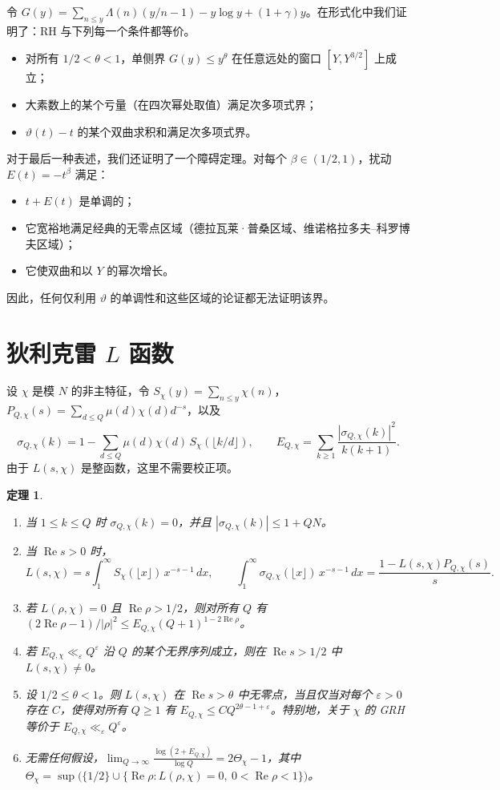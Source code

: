 \documentclass[11pt,a4paper]{amsart}
\newtheorem{teorema}{定理}
\theoremstyle{definition}
\theoremstyle{remark}
\renewcommand{\Re}{\operatorname{Re}}
\begin{document}
令 $G(y)=\sum_{n\le y}\Lambda(n)(y/n-1)-y\log y+(1+\gamma)y$。在形式化中我们证明了：RH 与下列每一个条件都等价。
\begin{itemize}
\item 对所有 $1/2<\theta<1$，单侧界 $G(y)\le y^\theta$ 在任意远处的窗口 $[Y,Y^{3/2}]$ 上成立；
\item 大素数上的某个亏量（在四次幂处取值）满足次多项式界；
\item $\vartheta(t)-t$ 的某个双曲求积和满足次多项式界。
\end{itemize}
对于最后一种表述，我们还证明了一个障碍定理。对每个 $\beta\in(1/2,1)$，扰动 $E(t)=-t^\beta$ 满足：
\begin{itemize}
\item $t+E(t)$ 是单调的；
\item 它宽裕地满足经典的无零点区域（德拉瓦莱·普桑区域、维诺格拉多夫--科罗博夫区域）；
\item 它使双曲和以 $Y$ 的幂次增长。
\end{itemize}
因此，任何仅利用 $\vartheta$ 的单调性和这些区域的论证都无法证明该界。

\section{狄利克雷 \texorpdfstring{$L$}{L} 函数}\label{sec:dirichlet}

设 $\chi$ 是模 $N$ 的非主特征，令 $S_\chi(y)=\sum_{n\le y}\chi(n)$，$P_{Q,\chi}(s)=\sum_{d\le Q}\mu(d)\chi(d)d^{-s}$，以及
\[
\sigma_{Q,\chi}(k)=1-\sum_{d\le Q}\mu(d)\chi(d)\,S_\chi(\lfloor k/d\rfloor),\qquad
E_{Q,\chi}=\sum_{k\ge1}\frac{|\sigma_{Q,\chi}(k)|^2}{k(k+1)}.
\]
由于 $L(s,\chi)$ 是整函数，这里不需要校正项。

\begin{teorema}\label{teo:dirichlet}
\begin{enumerate}
\item 当 $1\le k\le Q$ 时 $\sigma_{Q,\chi}(k)=0$，并且 $|\sigma_{Q,\chi}(k)|\le1+QN$。
\item 当 $\Re s>0$ 时，
\[
L(s,\chi)=s\int_1^\infty S_\chi(\lfloor x\rfloor)\,x^{-s-1}\,dx,\qquad
\int_1^\infty\sigma_{Q,\chi}(\lfloor x\rfloor)\,x^{-s-1}\,dx=\frac{1-L(s,\chi)P_{Q,\chi}(s)}{s}.
\]
\item 若 $L(\rho,\chi)=0$ 且 $\Re\rho>1/2$，则对所有 $Q$ 有 $(2\Re\rho-1)/|\rho|^2\le E_{Q,\chi}(Q+1)^{1-2\Re\rho}$。
\item 若 $E_{Q,\chi}\ll_\varepsilon Q^\varepsilon$ 沿 $Q$ 的某个无界序列成立，则在 $\Re s>1/2$ 中 $L(s,\chi)\ne0$。
\item 设 $1/2\le\theta<1$。则 $L(s,\chi)$ 在 $\Re s>\theta$ 中无零点，当且仅当对每个 $\varepsilon>0$ 存在 $C$，使得对所有 $Q\ge1$ 有 $E_{Q,\chi}\le CQ^{2\theta-1+\varepsilon}$。特别地，关于 $\chi$ 的 GRH 等价于 $E_{Q,\chi}\ll_\varepsilon Q^\varepsilon$。
\item 无需任何假设，$\displaystyle\lim_{Q\to\infty}\frac{\log(2+E_{Q,\chi})}{\log Q}=2\Theta_\chi-1$，其中 $\Theta_\chi=\sup\bigl(\{1/2\}\cup\{\Re\rho:L(\rho,\chi)=0,\ 0<\Re\rho<1\}\bigr)$。
\end{enumerate}
\end{teorema}
\end{document}

